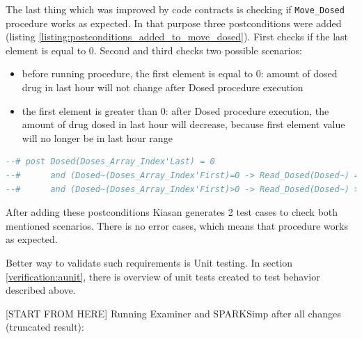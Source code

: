 The last thing which was improved by code contracts is checking if \lstinline{Move_Dosed} procedure works as expected. In that purpose three postconditions were added (listing \ref{listing:postconditions_added_to_move_dosed}). First checks if the last element is equal to 0. Second and third checks two possible scenarios: 
\begin{itemize}
    \item before running procedure, the first element is equal to 0: amount of dosed drug in last hour will not change after Dosed procedure execution
    \item the first element is greater than 0: after Dosed procedure execution, the amount of drug dosed in last hour will decrease, because first element value will no longer be in last hour range
\end{itemize}

\singlespacing
\begin{lstlisting}[language=ada, frame=single, gobble=0, caption={Postconditions added to Move\_Dosed procedure}, label={listing:postconditions_added_to_move_dosed}]
--# post Dosed(Doses_Array_Index'Last) = 0 
--#      and (Dosed~(Doses_Array_Index'First)=0 -> Read_Dosed(Dosed~) = Read_Dosed(Dosed))
--#      and (Dosed~(Doses_Array_Index'First)>0 -> Read_Dosed(Dosed~) > Read_Dosed(Dosed));
\end{lstlisting}
\doublespacing

After adding these postconditions Kiasan generates 2 test cases to check both mentioned scenarios. There is no error cases, which means that procedure works as expected. 

Better way to validate such requirements is Unit testing. In section \ref{verification:aunit}, there is overview of unit tests created to test behavior described above.

[START FROM HERE]
Running Examiner and SPARKSimp after all changes (truncated result):

